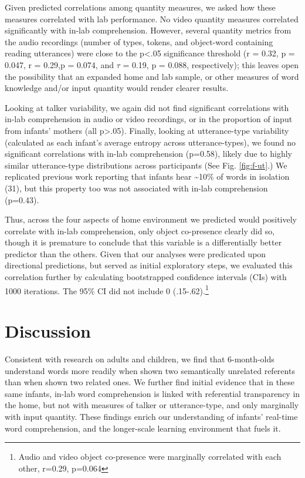 \documentclass[9pt,twocolumn,twoside,]{pnas-new}
\begin{document}
Given predicted correlations among quantity measures, we asked how these
measures correlated with lab performance. No video quantity measures
correlated significantly with in-lab comprehension. However, several
quantity metrics from the audio recordings (number of types, tokens, and
object-word containing reading utterances) were close to the
p\textless{}.05 significance threshold (r = 0.32, p = 0.047, r = 0.29,p
= 0.074, and \(\tau\) = 0.19, p = 0.088, respectively); this leaves open
the possibility that an expanded home and lab sample, or other measures
of word knowledge and/or input quantity would render clearer results.

Looking at talker variability, we again did not find significant
correlations with in-lab comprehension in audio or video recordings, or
in the proportion of input from infants' mothers (all
p\textgreater{}.05). Finally, looking at utterance-type variability
(calculated as each infant's average entropy across utterance-types), we
found no significant correlations with in-lab comprehension (p=0.58),
likely due to highly similar utterance-type distributions across
participants (See Fig. \ref{fig:f-ut}.) We replicated previous work
reporting that infants hear \textasciitilde{}10\% of words in isolation
(31), but this property too was not associated with in-lab comprehension
(p=0.43).

Thus, across the four aspects of home environment we predicted would
positively correlate with in-lab comprehension, only object co-presence
clearly did so, though it is premature to conclude that this variable is
a differentially better predictor than the others. Given that our
analyses were predicated upon directional predictions, but served as
initial exploratory steps, we evaluated this correlation further by
calculating bootstrapped confidence intervals (CIs) with 1000
iterations. The 95\% CI did not include 0 (.15-.62).\footnote{Audio and
  video object co-presence were marginally correlated with each other,
  r=0.29, p=0.064}

\section*{Discussion}\label{discussion}

Consistent with research on adults and children, we find that
6-month-olds understand words more readily when shown two semantically
unrelated referents than when shown two related ones. We further find
initial evidence that in these same infants, in-lab word comprehension
is linked with referential transparency in the home, but not with
measures of talker or utterance-type, and only marginally with input
quantity. These findings enrich our understanding of infants' real-time
word comprehension, and the longer-scale learning environment that fuels
it.
\end{document}
